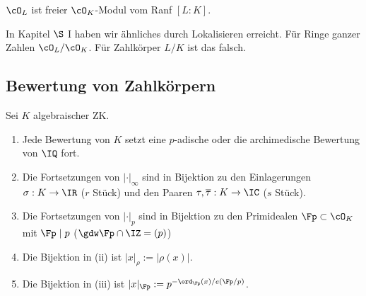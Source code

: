 \begin{Folgerung}
 $\cO_L$ ist freier $\cO_K$-Modul vom Ranf $[L:K]$.
\end{Folgerung}

\begin{Bemerkung}
 In Kapitel $\S$ I haben wir ähnliches durch Lokalisieren erreicht. Für Ringe ganzer Zahlen $\cO_L/\cO_K$. Für Zahlkörper $L/K$ ist das falsch.
\end{Bemerkung}

\subsection{Bewertung von Zahlkörpern}
\begin{Satz}
 Sei $K$ algebraischer ZK.
 \begin{enumerate}
  \item Jede Bewertung von $K$ setzt eine $p$-adische oder die archimedische Bewertung von $\IQ$ fort.
  \item Die Fortsetzungen von $|\cdot|_\infty$ sind in Bijektion zu den Einlagerungen $\sigma:K\rightarrow \IR$ ($r$ Stück)
  und den Paaren $\tau,\overline{\tau}:K\rightarrow\IC$ ($s$ Stück).
  \item Die Fortsetzungen von $|\cdot|_p$ sind in Bijektion zu den Primidealen $\Fp\subset\cO_K$ mit $\Fp\mid p$ ($\gdw \Fp\cap\IZ=(p)$)
  \item Die Bijektion in (ii) ist $|x|_\rho:=|\rho(x)|$.
  \item Die Bijektion in (iii) ist $|x|_\Fp:=p^{-\ord_\Fp(x)/e(\Fp/p)}$.
 \end{enumerate}
\end{Satz}

